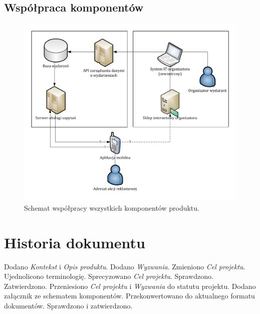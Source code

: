 \documentclass[10pt]{dokument-ppi}
\begin{document}
\subsection{Współpraca komponentów}
\begin{figure}[h!]
    \includegraphics[width=\textwidth]{./figury/schemat-komponentow}
    \caption{Schemat współpracy wszystkich komponentów produktu.}
    \label{fig:schemat_komponentow}
\end{figure}


\newpage
\section*{Historia dokumentu}
\begin{versions}
        Dodano \emph{Kontekst} i \emph{Opis produktu}.
        Dodano \emph{Wyzwania}.
        Zmieniono \emph{Cel projektu}.
        Ujednolicono terminologię. Sprecyzowano \emph{Cel projektu}.
        Sprawdzono.
        Zatwierdzono.
        Przeniesiono \emph{Cel projektu} i \emph{Wyzwania} do statutu projektu.
        Dodano załącznik ze schematem komponentów.
        Przekonwertowano do aktualnego formatu dokumentów.
        Sprawdzono i zatwierdzono.
\end{versions}
\end{document}
